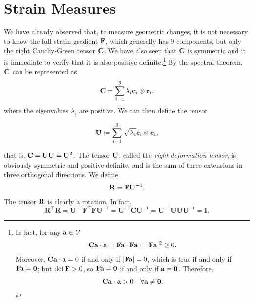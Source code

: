 \section{Strain Measures}
We have already observed that, to measure geometric  changes, it is not necessary to know the full strain gradient $\mathbf{F}$, which generally has 9 components, but only the right Cauchy-Green tensor $\mathbf{C}$. We have also seen that $\mathbf{C}$ is symmetric and it is immediate to verify that it is also positive definite.\footnote{In fact, for any $\mathbf{a}\in\mathcal{V}$
	\begin{equation}
		\mathbf{C} \mathbf{a}\cdot\mathbf{a} = \mathbf{F} \mathbf{a}\cdot\mathbf{F}\mathbf{a} = |\mathbf{F}\mathbf{a}|^2 \geq 0.
	\end{equation}
	Moreover, $\mathbf{C} \mathbf{a}\cdot\mathbf{a} = 0$ if and only if $|\mathbf{F} \mathbf{a}| = 0$, which is true if and only if $\mathbf{F} \mathbf{a} = \mathbf{0}$; but $\det \mathbf{F} > 0$, so $\mathbf{F}\mathbf{a} = \mathbf{0}$ if and only if $\mathbf{a} = \mathbf{0}$. Therefore,
	\begin{equation}
		\mathbf{C} \mathbf{a}\cdot\mathbf{a} > 0 \quad \forall \mathbf{a} \neq \mathbf{0}.
	\end{equation}
}
By the spectral theorem, $\mathbf{C}$ can be represented as
\begin{equation}
	\mathbf{C} = \sum_{i=1}^3 \lambda_i \mathbf{c}_i \otimes \mathbf{c}_i,
\end{equation}
where the eigenvalues $\lambda_i$ are positive. We can then define the tensor
\begin{definition}
	\begin{equation}
	\mathbf{U} \coloneqq \sum_{i=1}^3 \sqrt{\lambda_i} \mathbf{c}_i \otimes \mathbf{c}_i,
\end{equation}
\end{definition}
that is, $\mathbf{C} = \mathbf{U} \mathbf{U} = \mathbf{U}^2$. The tensor $\mathbf{U}$, called the \textit{right deformation tensor}, is obviously symmetric and positive definite, and is the sum of three extensions in three orthogonal directions. We define
\begin{equation}
	\mathbf{R} = \mathbf{F} \mathbf{U}^{-1}.
\end{equation}
The tensor $\mathbf{R}$ is clearly a rotation. In fact,
\begin{equation}
	\mathbf{R}^\top \mathbf{R} = \mathbf{U}^{-1} \mathbf{F}^\top \mathbf{F} \mathbf{U}^{-1} = \mathbf{U}^{-1} \mathbf{C} \mathbf{U}^{-1} = \mathbf{U}^{-1} \mathbf{U} \mathbf{U} \mathbf{U}^{-1} = \mathbf{I}.
\end{equation}

